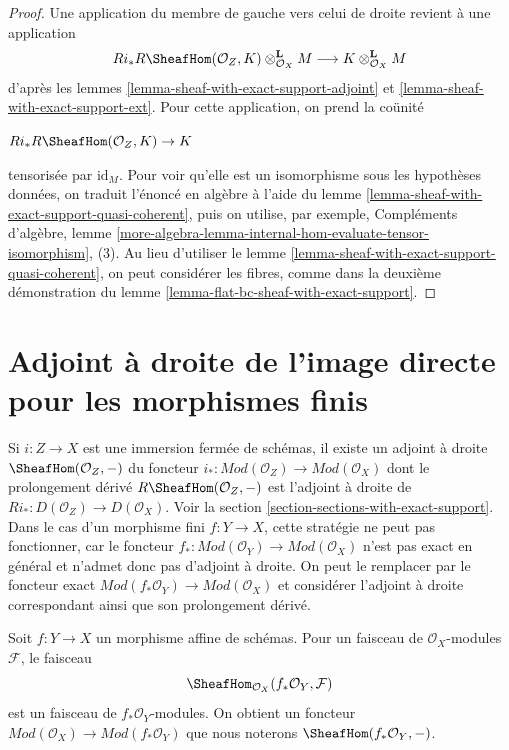 \begin{proof}
Une application du membre de gauche vers celui de droite revient à une application
$$
Ri_*R\SheafHom(\mathcal{O}_Z, K) \otimes_{\mathcal{O}_X}^\mathbf{L} M
\longrightarrow
K \otimes_{\mathcal{O}_X}^\mathbf{L} M
$$
d'après les lemmes \ref{lemma-sheaf-with-exact-support-adjoint} et \ref{lemma-sheaf-with-exact-support-ext}. Pour cette application, on prend la coünité
\par\noindent\hfil
$Ri_*R\SheafHom(\mathcal{O}_Z, K) \to K$
\hfil\par\noindent
tensorisée par $\text{id}_M$. Pour voir qu'elle est un isomorphisme sous les hypothèses données, on traduit l'énoncé en algèbre à l'aide du lemme \ref{lemma-sheaf-with-exact-support-quasi-coherent}, puis on utilise, par exemple, Compléments d'algèbre, lemme \ref{more-algebra-lemma-internal-hom-evaluate-tensor-isomorphism}, (3). Au lieu d'utiliser le lemme \ref{lemma-sheaf-with-exact-support-quasi-coherent}, on peut considérer les fibres, comme dans la deuxième démonstration du lemme \ref{lemma-flat-bc-sheaf-with-exact-support}.
\end{proof}



\section{Adjoint à droite de l'image directe pour les morphismes finis}
\label{section-duality-finite}

\noindent
Si $i : Z \to X$ est une immersion fermée de schémas, il existe un adjoint à droite $\SheafHom(\mathcal{O}_Z, -)$ du foncteur $i_* : \textit{Mod}(\mathcal{O}_Z) \to \textit{Mod}(\mathcal{O}_X)$ dont le prolongement dérivé $R\SheafHom(\mathcal{O}_Z, -)$ est l'adjoint à droite de $Ri_* : D(\mathcal{O}_Z) \to D(\mathcal{O}_X)$. Voir la section \ref{section-sections-with-exact-support}. Dans le cas d'un morphisme fini $f : Y \to X$, cette stratégie ne peut pas fonctionner, car le foncteur $f_* : \textit{Mod}(\mathcal{O}_Y) \to \textit{Mod}(\mathcal{O}_X)$ n'est pas exact en général et n'admet donc pas d'adjoint à droite. On peut le remplacer par le foncteur exact
$\textit{Mod}(f_*\mathcal{O}_Y) \to \textit{Mod}(\mathcal{O}_X)$
et considérer l'adjoint à droite correspondant ainsi que son prolongement dérivé.

\medskip\noindent
Soit $f : Y \to X$ un morphisme affine de schémas. Pour un faisceau de $\mathcal{O}_X$-modules $\mathcal{F}$, le faisceau
$$
\SheafHom_{\mathcal{O}_X}(f_*\mathcal{O}_Y, \mathcal{F})
$$
est un faisceau de $f_*\mathcal{O}_Y$-modules. On obtient un foncteur
$\textit{Mod}(\mathcal{O}_X) \to \textit{Mod}(f_*\mathcal{O}_Y)$
que nous noterons $\SheafHom(f_*\mathcal{O}_Y, -)$.


